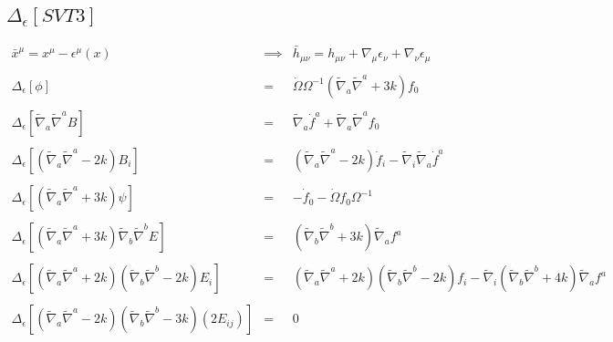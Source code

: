 \documentclass[10pt,letterpaper]{article}
\numberwithin{equation}{section}
\begin{document}
\subsection{$\Delta_\epsilon[SVT3]$}
\begin{eqnarray}
\bar x^\mu =  x^\mu - \epsilon^\mu(x) &\implies&  \bar h_{\mu\nu} = h_{\mu\nu} + \nabla_\mu \epsilon_\nu + \nabla_\nu \epsilon_\mu
\\ \nonumber\\
\Delta_\epsilon\left[ \phi \right]&=&  \dot{\Omega} \Omega^{-1} (\tilde{\nabla}_{a}\tilde{\nabla}^{a}+3k)f_{0}{}
\\ \nonumber\\
\Delta_\epsilon\left[ \tilde\nabla_a\tilde\nabla^a B \right] &=& \tilde{\nabla}_{a}\dot{f}^{a} + \tilde{\nabla}_{a}\tilde{\nabla}^{a}f_{0}{}
\\ \nonumber\\
\Delta_\epsilon\left[ (\tilde\nabla_a\tilde\nabla^a -2k)B_i \right] &=& (\tilde{\nabla}_{a}\tilde{\nabla}^{a}-2k)\dot{f}_{i} -  \tilde{\nabla}_{i}\tilde{\nabla}_{a}\dot{f}^{a}
\\ \nonumber\\
\Delta_\epsilon\left[(\tilde\nabla_a\tilde\nabla^a +3 k)\psi \right] &=& - \dot{f}_{0}{} -  \dot{\Omega} f_{0}{} \Omega^{-1}
\\ \nonumber\\
\Delta_\epsilon\left[ (\tilde\nabla_a\tilde\nabla^a +3 k)\tilde\nabla_b\tilde\nabla^b E \right] &=&(\tilde{\nabla}_{b}\tilde{\nabla}^{b}+3k)\tilde{\nabla}_{a}f^{a}
\\ \nonumber\\
\Delta_\epsilon\left[(\tilde\nabla_a\tilde\nabla^a +2 k)(\tilde\nabla_b\tilde\nabla^b-2k) E_i \right] &=& (\tilde\nabla_a\tilde\nabla^a +2 k)(\tilde\nabla_b\tilde\nabla^b-2k)f_{i} -  \tilde{\nabla}_{i}(\tilde{\nabla}_{b}\tilde{\nabla}^{b}+4k)\tilde{\nabla}_{a}f^{a}
\\ \nonumber\\
\Delta_\epsilon\left[(\tilde\nabla_a\tilde\nabla^a-2k)(\tilde\nabla_b\tilde\nabla^b -3k)(2E_{ij}) \right] &=& 0
\end{eqnarray}
\end{document}
